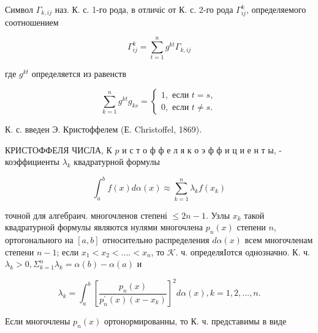 \documentclass[10pt]{article}
\begin{document}
Символ $\Gamma_{k, i j}$ наз. К. с. 1-го рода, в отличіс от К. с. 2-го рода $\Gamma_{i j}^{k}$, определяемого соотношением



\[

\Gamma_{i j}^{k}=\sum_{t=1}^{n} g^{k t} \Gamma_{k, i j}

\]



где $g^{k t}$ определяется из равенств



\[

\sum_{k=1}^{n} g^{k t} g_{k s}=\left\{\begin{array}{l}

1, \text { если } t=s, \\

0, \text { если } t \neq s .

\end{array}\right.

\]



К. с. введен Э. Кристоффелем (Е. Christoffel, 1869).



КРИСТОФФЕЛЯ ЧИСЛА, К $p$ и с т о ф ф е л я к о э ф ф и ц и е н т ы, - коэффициенты $\lambda_{k}$ квадратурной формулы



\[

\int_{a}^{b} f(x) d \alpha(x) \approx \sum_{k=1}^{n} \lambda_{k} f\left(x_{k}\right)

\]



точной для алгебраич. многочленов степені $\leqslant 2 n-1$. Узлы $x_{k}$ такой квадратурной формулы являются нулями многочлена $p_{n}(x)$ степени $n$, ортогонального на $[a, b]$ относительно распределения $d \alpha(x)$ всем многочленам степени $n-1$; если $x_{1}<x_{2}<\ldots .<x_{n}$, то $\mathcal{K}$. ч. определяІотся однозначно. К. ч. $\lambda_{k}>0, \Sigma_{k=1}^{n} \lambda_{k}=\alpha(b)-\alpha(a)$ и



\[

\lambda_{k}=\int_{a}^{b}\left[\frac{p_{n}(x)}{p_{n}^{\prime}(x)\left(x-x_{k}\right)}\right]^{2} d \alpha(x), k=1,2, \ldots, n .

\]



Если многочлены $p_{n}(x)$ ортонормированны, то К. ч. представимы в виде
\end{document}
